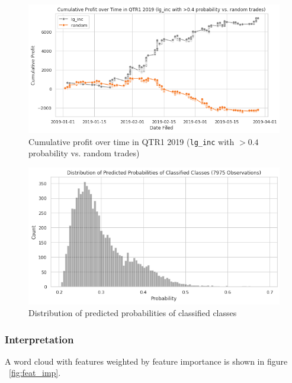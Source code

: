\documentclass{article}
\begin{document}
	\begin{figure}[h!]
		\includegraphics[width=\linewidth]{img/trade_lg_inc_40.png}
		\caption{Cumulative profit over time in QTR1 2019 (\lstinline{lg_inc} with $>0.4$ probability vs. random trades)}
		\label{fig:trade_lg_inc_0.4}
	\end{figure}

	\begin{figure}[h!]
		\includegraphics[width=\linewidth]{img/dist_pred_prob.png}
		\caption{Distribution of predicted probabilities of classified classes}
		\label{fig:dist_pred_prob}
	\end{figure}


	
	\subsubsection{Interpretation}
	
	A word cloud with features weighted by feature importance is shown in figure ~\ref{fig:feat_imp}.
	
\end{document}
